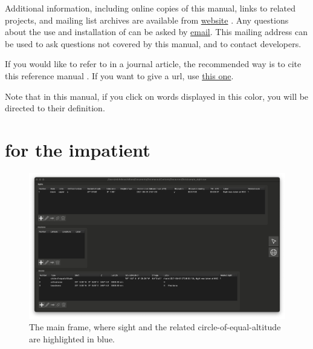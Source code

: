 \documentclass{ol-softwaremanual}
\begin{document}
Additional information, including online copies of this manual, links to related projects, and mailing list archives are available from \thel \href{\thelemacusurl}{website}  .
Any questions about the use and installation of \thel can be asked by \href{\contactemail}{email}. This mailing address can be used to ask questions not covered by this manual, and to contact \thel developers.

If you would like to refer to \thel in a journal article, the recommended way is to cite this reference manual \cite{castellana2024thelemacus-documentation}. If you want to give a url, use  \href{\thelemacusurl}{this one}. 

\pagebreak

Note that in this manual, if you click on words displayed in {\color{glossary-link-color} this color}, you will be directed to their definition. 

\section{\thel for the impatient}\label{sec-impatient}

\begin{figure}
  \centering
  \includegraphics[width=1\textwidth]{figures/list-frame.png}
  \caption{
    \label{fig-list-frame}
    The main frame, where  \gls{sight} and the related \gls{circle-of-equal-altitude} are highlighted in blue.  
  }
  \end{figure}
\end{document}
